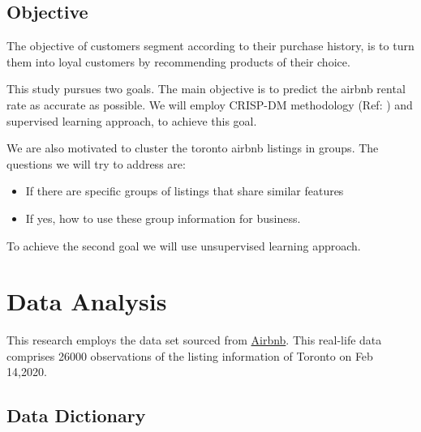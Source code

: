 \hypertarget{objective}{%
\subsection{Objective}\label{objective}}

The objective of customers segment according to their purchase history,
is to turn them into loyal customers by recommending products of their
choice.

This study pursues two goals. The main objective is to predict the
airbnb rental rate as accurate as possible. We will employ CRISP-DM
methodology (Ref: \cite{mining}) and supervised learning approach, to
achieve this goal.

We are also motivated to cluster the toronto airbnb listings in groups.
The questions we will try to address are:

\begin{itemize}
\tightlist
\item
  If there are specific groups of listings that share similar features
\item
  If yes, how to use these group information for business.
\end{itemize}

To achieve the second goal we will use unsupervised learning approach.

\hypertarget{data-analysis}{%
\section{Data Analysis}\label{data-analysis}}

This research employs the data set sourced from
\href{http://insideairbnb.com/get-the-data.html}{Airbnb}. This real-life
data comprises 26000 observations of the listing information of Toronto
on Feb 14,2020.

\hypertarget{data-dictionary}{%
\subsection{Data Dictionary}\label{data-dictionary}}

